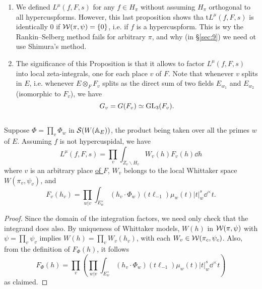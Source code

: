 \begin{remark*}
\begin{enumerate}[label=(\roman*)]
    \item We defined $L^\mu(f, F, s)$ for any $f \in H_\pi$ without assuming $H_\pi$ orthogonal to all hypercuspforms.
    However, this last proposition shows tha t$L^\mu(f, F, s)$ is identically $0$ if $\mathcal{W}(\pi, \psi) =\{0\}$, i.e. if $f$ is a hypercuspform.
    This is wy the Rankin--Selberg method fails for arbitrary $\pi$, and why (in \S \ref{sec:9}) we need ot use Shimura's method.
    \item The significance of this Proposition is that it allows to factor $L^\mu(f, F, s)$ into local zeta-integrals, one for each place $v$ of $F$.
    Note that whenever $v$ splits in $E$, i.e. whenever $E\otimes_F F_v$ splits as the direct sum of two fields $E_{w_1}$ and $E_{w_2}$ (isomorphic to $F_v$), we have
    \[
        G_v = G(F_v) \simeq \mathrm{GL}_3(F_v).
    \]
\end{enumerate} 
\end{remark*}


\subsection{}
\label{sec:3.6}
\begin{proposition}
Suppose $\Phi = \prod_v \Phi_w$ in $\mathcal{S}(W(\mathbb{A}_E))$, the product being taken over all the primes $w$ of $E$.
Assuming $f$ is not hypercuspidal, we have
\[
    L^\mu(f, F, s) = \prod_v \int_{Z_v \backslash H_v} W_v(h) F_v(h) \dd h
\]
where $v$ is an arbitrary place \underline{of $F$}, $W_v$ belongs to the local Whittaker space $W(\pi_v, \psi_v)$, and
\[
    F_v(h_v) = \prod_{w|v} \int_{E_w^\times} (h_v \cdot \Phi_w) (t \ell_{-1}) \mu_w(t) |t|_w^{s} \dd^\times t.
\]
\end{proposition}
\begin{proof}
Since the domain of the integration factors, we need only check that the integrand does also.
By uniqueness of Whittaker models, $W(h)$ in $\mathcal{W}(\pi, \psi)$ with $\psi =\prod_v \psi_v$ implies $W(h) = \prod_v W_v(h_v)$, with each $W_v \in\mathcal{W}(\pi_c, \psi_c)$.
Also, from the definition of $F_\Phi(h)$, it follows
\[
    F_\Phi(h) = \prod_v \left(\prod_{w|v} \int_{E_w^\times} (h_v \cdot \Phi_w) (t \ell_{-1}) \mu_w(t) |t|^{s}_w \dd^\times t\right)
\]
as claimed.
\end{proof}


\subsection{}
\label{sec:3.7}

